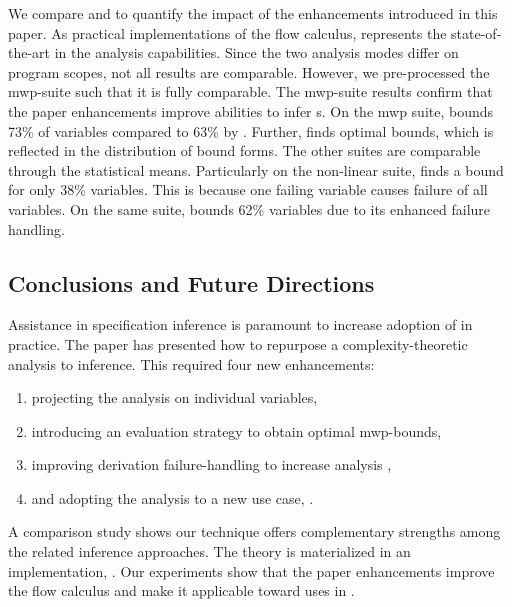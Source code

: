 We compare \ndx{\impl} and \ndx{\impf} to quantify the impact of the
enhancements introduced in this paper. As practical implementations of the flow
calculus, \ndx{\impf} represents the state-of-the-art in the
analysis capabilities. Since the two analysis modes differ on program scopes,
not all results are comparable. However, we pre-processed the mwp-suite such
that it is fully comparable. The mwp-suite results confirm that the paper
enhancements improve abilities to infer s. On the mwp suite,
\ndx{\impl} bounds 73\% of variables compared to 63\% by \ndx{\impf}. Further,
\ndx{\impl} finds optimal bounds, which is reflected in
the distribution of bound forms. The other suites are comparable through the
statistical means. Particularly on the non-linear suite, \ndx{\impf} finds a
bound for only 38\% variables. This is because one failing variable causes
failure of all variables. On the same suite, \impl bounds 62\% variables due to
its enhanced failure handling.

\subsection{Conclusions and Future Directions}
\label{sec:pc-conclusion}

Assistance in specification inference is paramount to
increase adoption of  in practice. The paper has presented
how to repurpose a complexity-theoretic analysis to 
inference. This required four new enhancements:

\begin{enumerate}[label=(\roman*)]
\item projecting the analysis on individual variables,
\item introducing an evaluation strategy to obtain optimal mwp-bounds,
\item improving derivation failure-handling to increase analysis
,
\item and adopting the analysis to a new use case, \ie {}.
\end{enumerate}

A comparison study shows our technique offers complementary strengths among the
related inference approaches. The theory is
materialized in an implementation, \ndx{\impl}. Our experiments show that the
paper enhancements improve the flow calculus and make it
applicable toward uses in .

